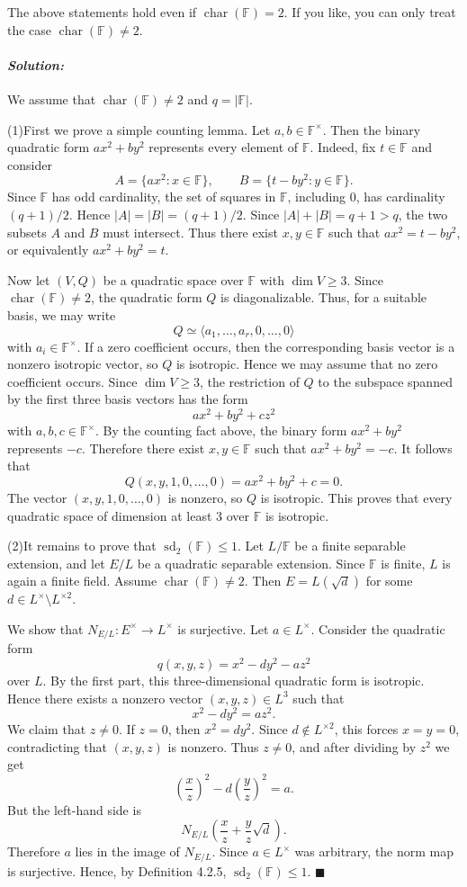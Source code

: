 \documentclass[12pt, a4paper]{article}
\newenvironment{solution}
  {\paragraph{\textit{Solution:}}\par\medskip}
  {\hfill$\blacksquare$\vspace{0.1cm}}
\begin{document}
The above statements hold even if $\operatorname{char}(\mathbb{F})=2$. If you like, you can only treat the case $\operatorname{char}(\mathbb{F})\neq 2$.

\begin{solution}
    We assume that $\operatorname{char}(\mathbb{F})\neq 2$ and $q=|\mathbb{F}|$.

    (1)First we prove a simple counting lemma. Let $a,b\in \mathbb{F}^{\times}$. Then the binary quadratic form $ax^2+by^2$ represents every element of $\mathbb{F}$. Indeed, fix $t\in \mathbb{F}$ and consider \[ A=\{ax^2:x\in \mathbb{F}\},\qquad B=\{t-by^2:y\in \mathbb{F}\}. \] Since $\mathbb{F}$ has odd cardinality, the set of squares in $\mathbb{F}$, including $0$, has cardinality $(q+1)/2$. Hence $|A|=|B|=(q+1)/2$. Since $|A|+|B|=q+1>q$, the two subsets $A$ and $B$ must intersect. Thus there exist $x,y\in \mathbb{F}$ such that $ax^2=t-by^2$, or equivalently $ax^2+by^2=t$.
    
    Now let $(V,Q)$ be a quadratic space over $\mathbb{F}$ with $\dim V\geq 3$. Since $\operatorname{char}(\mathbb{F})\neq 2$, the quadratic form $Q$ is diagonalizable. Thus, for a suitable basis, we may write \[ Q\simeq \langle a_1,\dots,a_r,0,\dots,0\rangle \] with $a_i\in \mathbb{F}^{\times}$. If a zero coefficient occurs, then the corresponding basis vector is a nonzero isotropic vector, so $Q$ is isotropic. Hence we may assume that no zero coefficient occurs. Since $\dim V\geq 3$, the restriction of $Q$ to the subspace spanned by the first three basis vectors has the form \[ ax^2+by^2+cz^2 \] with $a,b,c\in \mathbb{F}^{\times}$. By the counting fact above, the binary form $ax^2+by^2$ represents $-c$. Therefore there exist $x,y\in \mathbb{F}$ such that $ax^2+by^2=-c$. It follows that \[ Q(x,y,1,0,\dots,0)=ax^2+by^2+c=0. \] The vector $(x,y,1,0,\dots,0)$ is nonzero, so $Q$ is isotropic. This proves that every quadratic space of dimension at least $3$ over $\mathbb{F}$ is isotropic. 
    
    
    (2)It remains to prove that $\operatorname{sd}_2(\mathbb F)\leq 1$. Let
$L/\mathbb F$ be a finite separable extension, and let $E/L$ be a quadratic
separable extension. Since $\mathbb F$ is finite, $L$ is again a finite field.
Assume $\operatorname{char}(\mathbb F)\neq 2$. Then $E=L(\sqrt d)$ for some
$d\in L^\times\setminus L^{\times 2}$.

We show that $N_{E/L}:E^\times\to L^\times$ is surjective. Let
$a\in L^\times$. Consider the quadratic form
\[
q(x,y,z)=x^2-dy^2-az^2
\]
over $L$. By the first part, this three-dimensional quadratic form is
isotropic. Hence there exists a nonzero vector $(x,y,z)\in L^3$ such that
\[
x^2-dy^2=az^2.
\]
We claim that $z\neq 0$. If $z=0$, then $x^2=dy^2$. Since
$d\notin L^{\times 2}$, this forces $x=y=0$, contradicting that
$(x,y,z)$ is nonzero. Thus $z\neq 0$, and after dividing by $z^2$ we get
\[
\left(\frac{x}{z}\right)^2
-
d\left(\frac{y}{z}\right)^2
=a.
\]
But the left-hand side is
\[
N_{E/L}\left(\frac{x}{z}+\frac{y}{z}\sqrt d\right).
\]
Therefore $a$ lies in the image of $N_{E/L}$. Since $a\in L^\times$ was
arbitrary, the norm map is surjective. Hence, by Definition 4.2.5,
$\operatorname{sd}_2(\mathbb F)\leq 1$.
\end{solution}
\end{document}
